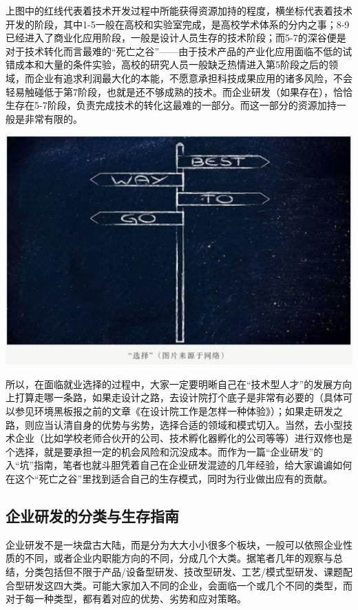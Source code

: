 \documentclass[]{book}
\begin{document}
上图中的红线代表着技术开发过程中所能获得资源加持的程度，横坐标代表着技术开发的阶段，其中1-5一般在高校和实验室完成，是高校学术体系的分内之事；8-9已经进入了商业化应用阶段，一般是设计人员生存的技术阶段；而5-7的深谷便是对于技术转化而言最难的``死亡之谷''------由于技术产品的产业化应用面临不低的试错成本和大量的条件实验，高校的研究人员一般缺乏热情进入第5阶段之后的领域，而企业有追求利润最大化的本能，不愿意承担科技成果应用的诸多风险，不会轻易触碰低于第7阶段，也就是还不够成熟的技术。而企业研发（如果存在），恰恰生存在5-7阶段，负责完成技术的转化这最难的一部分。而这一部分的资源加持一般是非常有限的。

\includegraphics[width=6.67in]{images/qiye4}

所以，在面临就业选择的过程中，大家一定要明晰自己在``技术型人才''的发展方向上打算走哪一条路，如果走设计之路，去设计院打个底子是非常有必要的（具体可以参见环境黑板报之前的文章《在设计院工作是怎样一种体验》）；如果走研发之路，则应当认清自身的优势与劣势，选择合适的领域和模式切入。当然，去小型技术企业（比如学校老师合伙开的公司、技术孵化器孵化的公司等等）进行双修也是个选择，就是要承担一定的机会风险和沉没成本。而作为一篇``企业研发''的入``坑''指南，笔者也就斗胆凭着自己在企业研发混迹的几年经验，给大家谝谝如何在这个``死亡之谷''里找到适合自己的生存模式，同时为行业做出应有的贡献。

\subsection{企业研发的分类与生存指南}

企业研发不是一块盘古大陆，而是分为大大小小很多个板块，一般可以依照企业性质的不同，或者企业内职能方向的不同，分成几个大类。据笔者几年的观察与总结，分类包括但不限于产品/设备型研发、技改型研发、工艺/模式型研发、课题配合型研发这四大类。可能大家加入不同的企业，会面临一个或几个不同的类型，而对于每一种类型，都有着对应的优势、劣势和应对策略。
\end{document}

